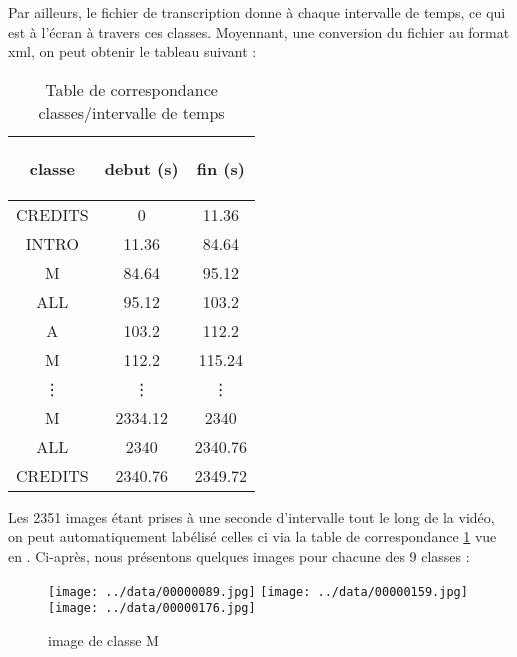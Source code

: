 \documentclass{book}
\begin{document}
Par ailleurs, le fichier de transcription donne à chaque intervalle de temps, ce qui est à l'écran à travers ces classes. Moyennant, une conversion du fichier au format xml, on peut obtenir
le tableau suivant :

\begin{table}[H]
\begin{center}
\begin{tabular}{|c|c|c|}
\hline
\begin{bf}classe\end{bf} & \begin{bf}debut (s)\end{bf} & \begin{bf}fin (s)\end{bf} \\
\hline
CREDITS	& 0 & 11.36 \\
\hline
INTRO   & 11.36	& 84.64 \\
\hline
M	& 84.64	& 95.12 \\
\hline
ALL	& 95.12	& 103.2 \\
\hline
A	& 103.2	& 112.2 \\
\hline
M	& 112.2	& 115.24 \\
\hline
\vdots & \vdots &\vdots \\
\hline
M	& 2334.12 & 2340 \\
\hline
ALL	& 2340 & 2340.76 \\
\hline
CREDITS	& 2340.76 & 2349.72 \\
\hline
\end{tabular}
\end{center}
\caption{Table de correspondance classes/intervalle de temps}
\label{Table correspondance classe/temps}
\end{table}
\clearpage

Les 2351 images étant prises à une seconde d'intervalle tout le long de la vidéo, on peut automatiquement labélisé celles ci via la table de
correspondance \ref{Table correspondance classe/temps} vue en \pageref{Table correspondance classe/temps}.
Ci-après, nous présentons quelques images pour chacune des 9 classes :
\begin{figure}[H]
\begin{center}
\texttt{[image: ../data/00000089.jpg]}
\texttt{[image: ../data/00000159.jpg]}
\texttt{[image: ../data/00000176.jpg]}
\end{center}
\caption{image de classe M}
\label{classeM}
\end{figure}
\end{document}

